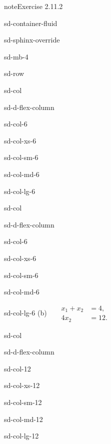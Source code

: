 \documentclass[letterpaper,10pt,english]{jupyterBook}
\begin{document}
\begin{sphinxadmonition}{note}{Exercise 2.11.2}
\begin{sphinxuseclass}{sd-container-fluid}
\begin{sphinxuseclass}{sd-sphinx-override}
\begin{sphinxuseclass}{sd-mb-4}
\begin{sphinxuseclass}{sd-row}
\begin{sphinxuseclass}{sd-col}
\begin{sphinxuseclass}{sd-d-flex-column}
\begin{sphinxuseclass}{sd-col-6}
\begin{sphinxuseclass}{sd-col-xs-6}
\begin{sphinxuseclass}{sd-col-sm-6}
\begin{sphinxuseclass}{sd-col-md-6}
\begin{sphinxuseclass}{sd-col-lg-6}
\end{sphinxuseclass}
\end{sphinxuseclass}
\end{sphinxuseclass}
\end{sphinxuseclass}
\end{sphinxuseclass}
\end{sphinxuseclass}
\end{sphinxuseclass}
\begin{sphinxuseclass}{sd-col}
\begin{sphinxuseclass}{sd-d-flex-column}
\begin{sphinxuseclass}{sd-col-6}
\begin{sphinxuseclass}{sd-col-xs-6}
\begin{sphinxuseclass}{sd-col-sm-6}
\begin{sphinxuseclass}{sd-col-md-6}
\begin{sphinxuseclass}{sd-col-lg-6}
\sphinxAtStartPar
(b)  
\( \begin{align*}
     x_{1} +  x_{2} &= 4, \\
     4 x_{2} &= 12.
\end{align*} \)

\end{sphinxuseclass}
\end{sphinxuseclass}
\end{sphinxuseclass}
\end{sphinxuseclass}
\end{sphinxuseclass}
\end{sphinxuseclass}
\end{sphinxuseclass}
\begin{sphinxuseclass}{sd-col}
\begin{sphinxuseclass}{sd-d-flex-column}
\begin{sphinxuseclass}{sd-col-12}
\begin{sphinxuseclass}{sd-col-xs-12}
\begin{sphinxuseclass}{sd-col-sm-12}
\begin{sphinxuseclass}{sd-col-md-12}
\begin{sphinxuseclass}{sd-col-lg-12}
\sphinxAtStartPar
 


\end{sphinxuseclass}
\end{sphinxuseclass}
\end{sphinxuseclass}
\end{sphinxuseclass}
\end{sphinxuseclass}
\end{sphinxuseclass}
\end{sphinxuseclass}
\end{sphinxuseclass}
\end{sphinxuseclass}
\end{sphinxuseclass}
\end{sphinxuseclass}
\end{sphinxadmonition}
\end{document}
